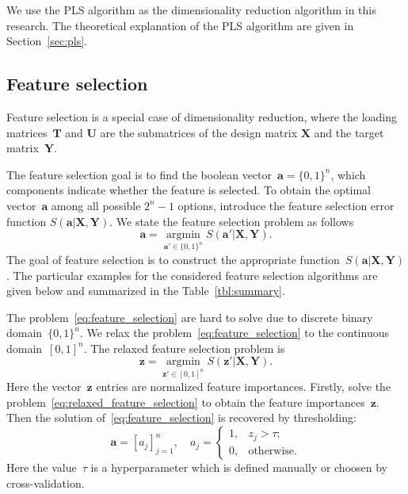 \documentclass[12pt,twoside]{article}
\theoremstyle{definition}
\newcommand{\ba}{\mathbf{a}}
\newcommand{\bz}{\mathbf{z}}
\newcommand{\bY}{\mathbf{Y}}
\newcommand{\bX}{\mathbf{X}}
\newcommand{\bT}{\mathbf{T}}
\newcommand{\bU}{\mathbf{U}}
\newcommand{\argmin}{\mathop{\arg \min}\limits}
\begin{document}
We use the PLS algorithm as the dimensionality reduction algorithm in this research.
The theoretical explanation of the PLS algorithm are given in Section~\ref{sec:pls}.

\subsection{Feature selection}
Feature selection is a special case of dimensionality reduction, where the loading matrices~$\bT$ and $\bU$ are the submatrices of the design matrix $\bX$ and the target matrix~$\bY$.

The feature selection goal is to find the boolean vector~$\ba = \{0, 1\}^n$, which components indicate whether the feature is selected. 
To obtain the optimal vector~$\ba$ among all possible $2^n - 1$ options, introduce the feature selection error function $S(\ba | \bX, \bY)$. 
We state the feature selection problem as follows 
\begin{equation}
\ba = \argmin_{\ba' \in \{0, 1\}^n} S(\ba' | \bX, \bY).
\label{eq:feature_selection}
\end{equation}
The goal of feature selection is to construct the appropriate function~$S(\ba | \bX, \bY)$. The particular examples for the considered feature selection algorithms are given below and summarized in the Table~\ref{tbl:summary}.

The problem~\eqref{eq:feature_selection} are hard to solve due to discrete binary domain~$\{0, 1\}^n$. We relax the problem~\eqref{eq:feature_selection} to the continuous domain~$[0, 1]^n$. The relaxed feature selection problem is
\begin{equation}
\bz = \argmin_{\bz' \in [0, 1]^n} S(\bz' | \bX, \bY).
\label{eq:relaxed_feature_selection}
\end{equation}
Here the vector~$\bz$ entries are normalized feature importances.
Firstly, solve the problem~\eqref{eq:relaxed_feature_selection} to obtain the feature importances~$\bz$. 
Then the solution of~\eqref{eq:feature_selection} is recovered by thresholding:
\begin{equation*}
\ba = [a_j]_{j=1}^n, \quad 
a_j = \begin{cases}
1, & z_j > \tau; \\
0, & \text{otherwise}.
\end{cases}
\end{equation*}
Here the value~$\tau$ is a hyperparameter which is defined manually or choosen by cross-validation. 
\end{document}
